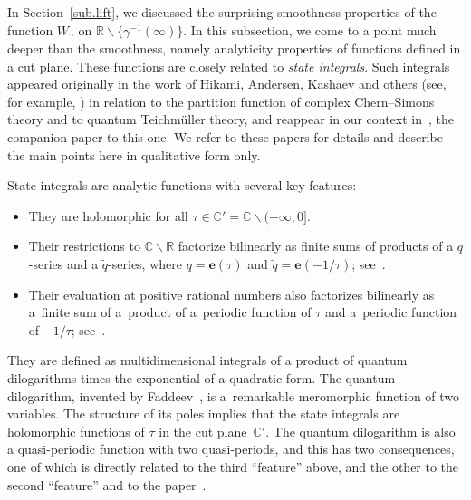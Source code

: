 \documentclass[pdftex]{sigma}
\numberwithin{equation}{section}
\def\BR{\mathbb R}
\def\BC{\mathbb C}
\def\e{\mathbf{e}}
\def\R{\mathbb R}
\def\i{^{-1}}
\def\e{\mathbf{e}}
\def\ssm{\smallsetminus}
\def\g{\gamma}
\begin{document}
In Section~\ref{sub.lift}, we discussed the surprising smoothness properties
of the function $W_\g$ on $\R\ssm\{\g\i(\infty)\}$. In this subsection, we
come to a point much deeper than the smoothness, namely analyticity properties
of functions defined in a cut plane. These functions are closely related to
\emph{state integrals}. Such integrals appeared originally in the work of Hikami,
Andersen, Kashaev and others (see, for example, \cite{AK, DGLZ, Hikami}) in relation to
the partition function of complex Chern--Simons theory and to quantum Teichm\"uller
theory, and reappear in our context in~\cite{GZ:qseries}, the companion paper to this one.
We refer to these papers for details and describe the main points here in qualitative form only.

State integrals are analytic functions with several key features:
\begin{itemize}\itemsep=0pt
\item
 They are holomorphic for all $\tau \in \BC'=\BC\ssm(-\infty,0] $.
\item
 Their restrictions to $\BC\ssm\BR$ factorize bilinearly as finite sums of products of
 a $q$-series and a $\tilde q$-series, where $q=\e(\tau)$ and $\tilde q=\e(-1/\tau)$;
 see~\cite{holomorphic-blocks,GK:qseries}.
\item
 Their evaluation at positive rational numbers also factorizes bilinearly as a~finite
 sum of a~product of a~periodic function of $\tau$ and a~periodic function of
 $-1/\tau$; see~\cite{GK:evaluation}.
\end{itemize}
They are defined as multidimensional integrals of a product of quantum dilogarithms
times the exponential of a quadratic form. The quantum dilogarithm, invented
by Faddeev~\cite{Faddeev,FK-QDL}, is a~remarkable meromorphic function of two variables.
The structure of its poles implies that the state integrals are holomorphic
functions of $\tau$ in the cut plane~$\BC'$. The quantum dilogarithm is also a
quasi-periodic function with two quasi-periods, and this has two consequences, one of
which is directly related to the third ``feature'' above, and the other to the second
``feature'' and to the paper~\cite{GZ:qseries}.
\end{document}
